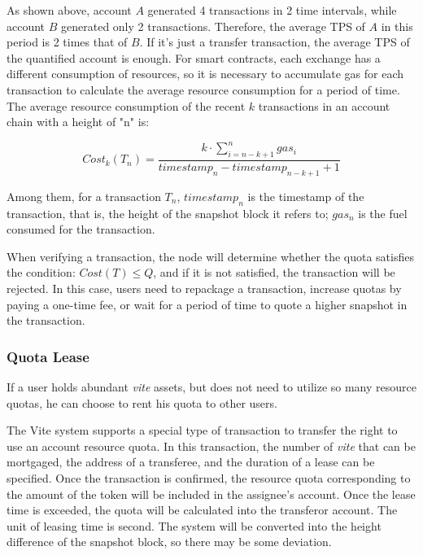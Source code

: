 \documentclass[UTF8,nofonts]{article}
\begin{document}
\begin{multicols}{2}
As shown above, account $A$ generated 4 transactions in 2 time intervals, while account $B$ generated only 2 transactions. Therefore, the average TPS of  $A$ in this period is 2 times that of $B$. If it's just a transfer transaction, the average TPS of the quantified account is enough. For smart contracts, each exchange has a different consumption of resources, so it is necessary to accumulate gas for each transaction to calculate the average resource consumption for a period of time. The average resource consumption of the recent $k$ transactions in an account chain with a height of "n" is:

\begin{equation}
Cost_{k}(T_n) = \frac{k \cdot \sum_{i=n-k+1}^{n}gas_{i}}{timestamp_{n} - timestamp_{n-k+1} + 1} 
\end{equation}

Among them, for a transaction $T_n$, $timestamp_n$ is the timestamp of the transaction, that is, the height of the snapshot block it refers to; $gas_n$ is the fuel consumed for the transaction.

When verifying a transaction, the node will determine whether the quota satisfies the condition: $Cost(T) \leq Q$, and if it is not satisfied, the transaction will be rejected. In this case, users need to repackage a transaction, increase quotas by paying a one-time fee, or wait for a period of time to quote a higher snapshot in the transaction.

\subsubsection{Quota Lease}

If a user holds abundant \textit{vite} assets, but does not need to utilize so many resource quotas, he can choose to rent his quota to other users.

The Vite system supports a special type of transaction to transfer the right to use an account resource quota. In this transaction, the number of \textit{vite} that can be mortgaged, the address of a transferee, and the duration of a lease can be specified. Once the transaction is confirmed, the resource quota corresponding to the amount of the token will be included in the assignee's account. Once the lease time is exceeded, the quota will be calculated into the transferor account. The unit of leasing time is second. The system will be converted into the height difference of the snapshot block, so there may be some deviation.


\end{multicols}
\end{document}
